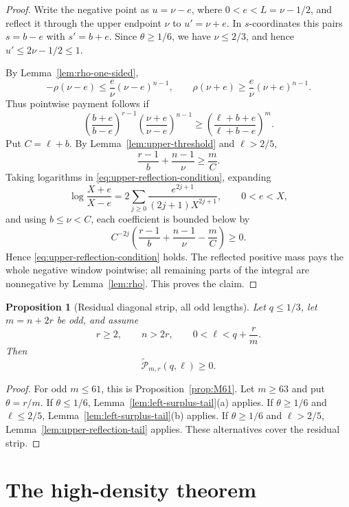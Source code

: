 \documentclass[11pt]{article}
\newtheorem{proposition}[theorem]{Proposition}
\newcommand{\wtP}{\widetilde{\mathcal P}}
\begin{document}
\begin{proof}
Write the negative point as $u=\nu-e$, where $0<e<L=\nu-1/2$, and reflect it through the upper endpoint $\nu$ to $u'=\nu+e$.  In $s$-coordinates this pairs $s=b-e$ with $s'=b+e$.  Since $\theta\ge1/6$, we have $\nu\le2/3$, and hence $u'\le2\nu-1/2\le1$.

By Lemma~\ref{lem:rho-one-sided},
\[
        -\rho(\nu-e)\le\frac e\nu(\nu-e)^{n-1},
        \qquad
        \rho(\nu+e)\ge\frac e\nu(\nu+e)^{n-1}.
\]
Thus pointwise payment follows if
\begin{equation}\label{eq:upper-reflection-condition}
        \left(\frac{b+e}{b-e}\right)^{r-1}
        \left(\frac{\nu+e}{\nu-e}\right)^{n-1}
        \ge
        \left(\frac{\ell+b+e}{\ell+b-e}\right)^m.
\end{equation}
Put $C=\ell+b$.  By Lemma~\ref{lem:upper-threshold} and $\ell>2/5$,
\[
        \frac{r-1}{b}+\frac{n-1}{\nu}\ge\frac mC.
\]
Taking logarithms in \eqref{eq:upper-reflection-condition}, expanding
\[
        \log\frac{X+e}{X-e}=2\sum_{j\ge0}\frac{e^{2j+1}}{(2j+1)X^{2j+1}},
        \qquad 0<e<X,
\]
and using $b\le\nu<C$, each coefficient is bounded below by
\[
        C^{-2j}\left(\frac{r-1}{b}+\frac{n-1}{\nu}-\frac mC\right)\ge0.
\]
Hence \eqref{eq:upper-reflection-condition} holds.  The reflected positive mass pays the whole negative window pointwise; all remaining parts of the integral are nonnegative by Lemma~\ref{lem:rho}.  This proves the claim.
\end{proof}

\begin{proposition}[Residual diagonal strip, all odd lengths]\label{prop:residual-all}
Let $q\le1/3$, let $m=n+2r$ be odd, and assume
\[
        r\ge2,
        \qquad n>2r,
        \qquad 0<\ell<q+\frac rm .
\]
Then
\[
        \wtP_{m,r}(q,\ell)\ge0.
\]
\end{proposition}

\begin{proof}
For odd $m\le61$, this is Proposition~\ref{prop:M61}.  Let $m\ge63$ and put $\theta=r/m$.  If $\theta\le1/6$, Lemma~\ref{lem:left-surplus-tail}(a) applies.  If $\theta\ge1/6$ and $\ell\le2/5$, Lemma~\ref{lem:left-surplus-tail}(b) applies.  If $\theta\ge1/6$ and $\ell>2/5$, Lemma~\ref{lem:upper-reflection-tail} applies.  These alternatives cover the residual strip.
\end{proof}

\section{The high-density theorem}\label{sec:high-density-theorem}
\end{document}

